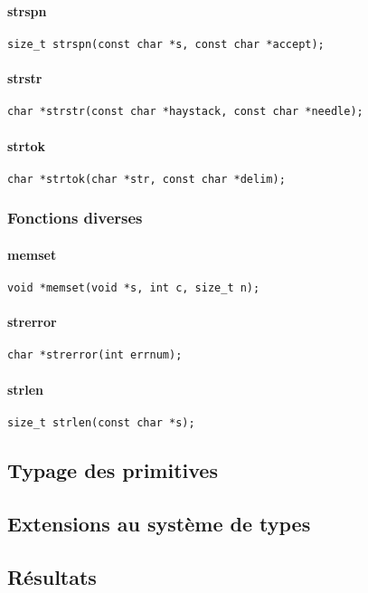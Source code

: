 \paragraph{strspn}
\begin{Verbatim}
size_t strspn(const char *s, const char *accept);
\end{Verbatim}
\paragraph{strstr}
\begin{Verbatim}
char *strstr(const char *haystack, const char *needle);
\end{Verbatim}
\paragraph{strtok}
\begin{Verbatim}
char *strtok(char *str, const char *delim);
\end{Verbatim}

\subsubsection{Fonctions diverses}

\paragraph{memset}
\begin{Verbatim}
void *memset(void *s, int c, size_t n);
\end{Verbatim}
\paragraph{strerror}
\begin{Verbatim}
char *strerror(int errnum);
\end{Verbatim}
\paragraph{strlen}
\begin{Verbatim}
size_t strlen(const char *s);
\end{Verbatim}

\subsection{Typage des primitives}

\subsection{Extensions au système de types}

\subsection{Résultats}%

